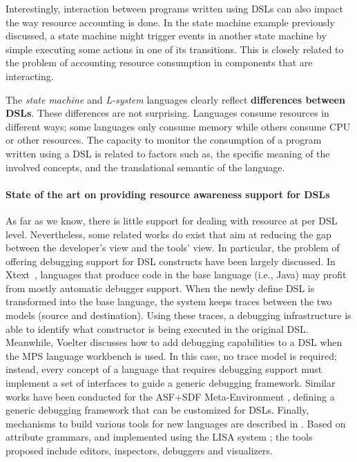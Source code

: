 Interestingly, interaction between programs written using DSLs can also impact the way resource accounting is done.
In the state machine example previously discussed, a state machine might trigger events in another state machine by simple executing some actions in one of its transitions.
This is closely related to the problem of accounting resource consumption in components that are interacting.

The \textit{state machine} and \textit{L-system} languages clearly reflect \textbf{differences between DSLs}.
These differences are not surprising.
Languages consume resources in different ways; some languages only consume memory while others consume CPU or other resources.
The capacity to monitor the consumption of a program written using a DSL is related to factors such as,
the specific meaning of the involved concepts,
and the translational semantic of the language.

\paragraph{State of the art on providing resource awareness support for DSLs}
As far as we know, there is little support for dealing with resource at per DSL level.
Nevertheless, some related works do exist that aim at reducing the gap between the developer's view and the tools' view.
In particular, the problem of offering debugging support for DSL constructs have been largely discussed.
In Xtext~\cite{Eysholdt:2010:XIY:1869542.1869625}, languages that produce code in the base language (i.e., Java) may profit from mostly automatic debugger support.
When the newly define DSL is transformed into the base language, the system keeps traces between the two models (source and destination).
Using these traces, a debugging infrastructure is able to identify what constructor is being executed in the original DSL.
Meanwhile, Voelter \cite{Voelter2010} discusses how to add debugging capabilities to a DSL when the MPS language workbench is used.
In this case, no trace model is required; instead, every concept of a language that requires debugging support must implement a set of interfaces to guide a generic debugging framework.
Similar works have been conducted \cite{vandenBrand:2005:TGD:1705513.1705667} for the ASF+SDF Meta-Environment \cite{vandenBrand20013}, defining a generic debugging framework that can be customized for DSLs.
Finally, mechanisms to build various tools for new languages are described in \cite{Henriques2005}.
Based on attribute grammars, and implemented using the LISA system \cite{Mernik2002}; the tools proposed include editors, inspectors, debuggers and visualizers.

